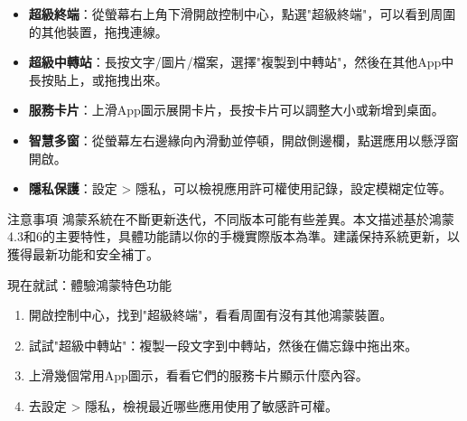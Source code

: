 
\begin{itemize}
  \item \textbf{超級終端}：從螢幕右上角下滑開啟控制中心，點選"超級終端"，可以看到周圍的其他裝置，拖拽連線。
  \item \textbf{超級中轉站}：長按文字/圖片/檔案，選擇"複製到中轉站"，然後在其他App中長按貼上，或拖拽出來。
  \item \textbf{服務卡片}：上滑App圖示展開卡片，長按卡片可以調整大小或新增到桌面。
  \item \textbf{智慧多窗}：從螢幕左右邊緣向內滑動並停頓，開啟側邊欄，點選應用以懸浮窗開啟。
  \item \textbf{隱私保護}：設定 > 隱私，可以檢視應用許可權使用記錄，設定模糊定位等。
\end{itemize}

\begin{tcbwarn}{注意事項}
鴻蒙系統在不斷更新迭代，不同版本可能有些差異。本文描述基於鴻蒙4.3和6的主要特性，具體功能請以你的手機實際版本為準。建議保持系統更新，以獲得最新功能和安全補丁。

\end{tcbwarn}

\begin{tcbpractice}{現在就試：體驗鴻蒙特色功能}
\begin{enumerate}
  \item 開啟控制中心，找到"超級終端"，看看周圍有沒有其他鴻蒙裝置。
  \item 試試"超級中轉站"：複製一段文字到中轉站，然後在備忘錄中拖出來。
  \item 上滑幾個常用App圖示，看看它們的服務卡片顯示什麼內容。
  \item 去設定 > 隱私，檢視最近哪些應用使用了敏感許可權。
\end{enumerate}

\end{tcbpractice}

